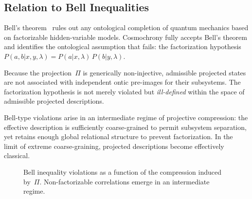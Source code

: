 \subsection{Relation to Bell Inequalities}
  \label{subsec:relation-to-bell-inequalities}

  Bell's theorem~\cite{Bell1964} rules out any ontological completion of
  quantum mechanics based on factorizable hidden-variable models.
  Cosmochrony fully accepts Bell's theorem and identifies the ontological
  assumption that fails: the factorization hypothesis $P(a,b|x,y,\lambda) = P(a|x,\lambda)\,P(b|y,\lambda)$.

  Because the projection~$\Pi$ is generically non-injective, admissible
  projected states are not associated with independent ontic pre-images for their subsystems.
  The factorization hypothesis is not merely violated but \emph{ill-defined}
  within the space of admissible projected descriptions.

  Bell-type violations arise in an intermediate regime of projective
  compression: the effective description is sufficiently coarse-grained to
  permit subsystem separation, yet retains enough global relational structure to prevent factorization.
  In the limit of extreme coarse-graining, projected descriptions become effectively classical.

  \begin{figure}[t]
    \centering
    \caption{Bell inequality violations as a function of the
    compression induced by~$\Pi$.
    Non-factorizable correlations emerge in an intermediate regime.}
    \label{fig:bell-compression-regime}
  \end{figure}

